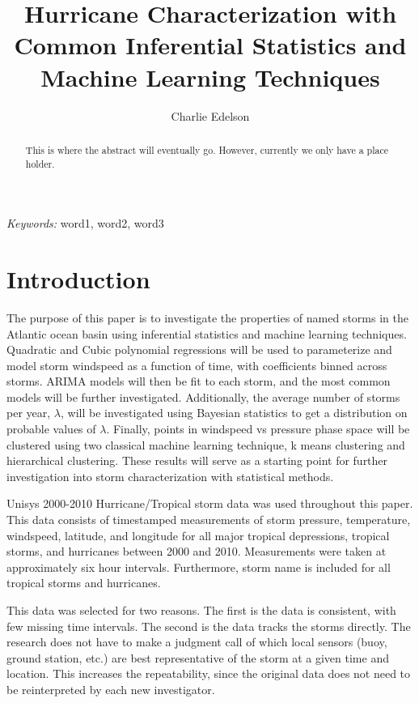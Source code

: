 \documentclass{article}
\title{Hurricane Characterization with Common Inferential Statistics and Machine Learning Techniques}
\author{Charlie Edelson}
\date{}
\providecommand{\keywords}[1]{\small{\textit{Keywords:} #1}}
\begin{document}
	
	\maketitle

	\begin{abstract}
	This is where the abstract will eventually go. However, currently we only have a place holder.
	\end{abstract}
	
	\keywords{word1, word2, word3}

	\section{Introduction}
	The purpose of this paper is to investigate the properties of named storms in the Atlantic ocean basin using inferential 
statistics and machine learning techniques. Quadratic and Cubic polynomial regressions will be used to parameterize and model storm 
windspeed as a function of time, with coefficients binned across storms. ARIMA models will then be fit to each storm, and the most common 
models will be further investigated. Additionally, the average number of storms per year, $\lambda$, will be investigated using Bayesian 
statistics to get a distribution on probable values of $\lambda$. Finally, points in windspeed vs pressure phase space will be clustered 
using two classical machine learning technique, k means clustering and hierarchical clustering. These results will serve as a starting point for further investigation into storm characterization with statistical methods.

	Unisys 2000-2010 Hurricane/Tropical storm data was used throughout this paper\cite{Unisys}. This data consists of timestamped 
measurements of storm pressure, temperature, windspeed, latitude, and longitude for all major tropical depressions, tropical storms, and 
hurricanes between 2000 and 2010. Measurements were taken at approximately six hour intervals. Furthermore, storm name is included for all 
tropical storms and hurricanes.

	This data was selected for two reasons. The first is the data is consistent, with few missing time intervals. The second is the data tracks the storms directly. The research does not have to make a judgment call of which local sensors (buoy, ground station, etc.) are best representative of the storm at a given time and location. This increases the repeatability, since the original data does not need to be reinterpreted by each new investigator.
\end{document}
